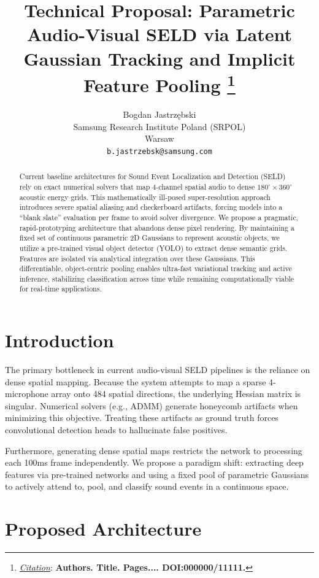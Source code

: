 \documentclass{article}
\title{Technical Proposal: Parametric Audio-Visual SELD via Latent Gaussian Tracking and Implicit Feature Pooling
\thanks{\textit{\underline{Citation}}: 
\textbf{Authors. Title. Pages.... DOI:000000/11111.}} 
}
\author{
  Bogdan Jastrzębski \\
  Samsung Research Institute Poland (SRPOL) \\
  Warsaw \\
  \texttt{b.jastrzebsk@samsung.com} \\
}
\begin{document}
\maketitle


\begin{abstract}
Current baseline architectures for Sound Event Localization and Detection (SELD) rely on exact numerical solvers that map 4-channel spatial audio to dense $180^\circ \times 360^\circ$ acoustic energy grids. This mathematically ill-posed super-resolution approach introduces severe spatial aliasing and checkerboard artifacts, forcing models into a ``blank slate'' evaluation per frame to avoid solver divergence. We propose a pragmatic, rapid-prototyping architecture that abandons dense pixel rendering. By maintaining a fixed set of continuous parametric 2D Gaussians to represent acoustic objects, we utilize a pre-trained visual object detector (YOLO) to extract dense semantic grids. Features are isolated via analytical integration over these Gaussians. This differentiable, object-centric pooling enables ultra-fast variational tracking and active inference, stabilizing classification across time while remaining computationally viable for real-time applications.
\end{abstract}




\section{Introduction}
The primary bottleneck in current audio-visual SELD pipelines is the reliance on dense spatial mapping. Because the system attempts to map a sparse 4-microphone array onto 484 spatial directions, the underlying Hessian matrix is singular. Numerical solvers (e.g., ADMM) generate honeycomb artifacts when minimizing this objective. Treating these artifacts as ground truth forces convolutional detection heads to hallucinate false positives. 

Furthermore, generating dense spatial maps restricts the network to processing each 100ms frame independently. We propose a paradigm shift: extracting deep features via pre-trained networks and using a fixed pool of parametric Gaussians to actively attend to, pool, and classify sound events in a continuous space. 

\section{Proposed Architecture}
\end{document}
